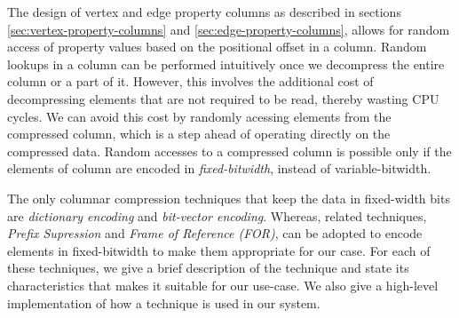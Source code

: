 The design of vertex and edge property columns as described in sections \ref{sec:vertex-property-columns} and \ref{sec:edge-property-columns}, allows for random access of property values based on the positional offset in a column. Random lookups in a column can be performed intuitively once we decompress the entire column or a part of it. However, this involves the additional cost of decompressing elements that are not required to be read, thereby wasting CPU cycles. We can avoid this cost by randomly acessing elements from the compressed column, which is a step ahead of operating directly on the compressed data. Random accesses to a compressed column is possible only if the elements of column are encoded in \emph{fixed-bitwidth}, instead of variable-bitwidth. 

The only columnar compression techniques that keep the data in fixed-width bits are \emph{dictionary encoding} and \emph{bit-vector encoding}. Whereas, related techniques, \emph{Prefix Supression} and \emph{Frame of Reference (FOR)}, can be adopted to encode elements in fixed-bitwidth to make them appropriate for our case. For each of these techniques, we give a brief description of the technique and state its characteristics that makes it suitable for our use-case. We also give a high-level implementation of how a technique is used in our system.

